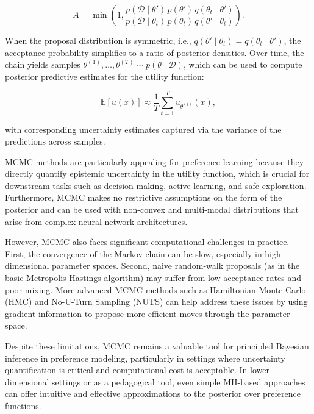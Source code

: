 \documentclass[
  letterpaper,
  numbers=noenddot,
  DIV=11]{scrreprt}
\theoremstyle{plain}
\theoremstyle{definition}
\theoremstyle{remark}
\begin{document}
\[
A = \min\left(1, \frac{p(\mathcal{D} \mid \theta') \, p(\theta') \, q(\theta_t \mid \theta')}{p(\mathcal{D} \mid \theta_t) \, p(\theta_t) \, q(\theta' \mid \theta_t)}\right).
\]

When the proposal distribution is symmetric, i.e.,
\(q(\theta' \mid \theta_t) = q(\theta_t \mid \theta')\), the acceptance
probability simplifies to a ratio of posterior densities. Over time, the
chain yields samples
\(\theta^{(1)}, \dots, \theta^{(T)} \sim p(\theta \mid \mathcal{D})\),
which can be used to compute posterior predictive estimates for the
utility function:

\[
\mathbb{E}[u(x)] \approx \frac{1}{T} \sum_{t=1}^T u_{\theta^{(t)}}(x),
\]

with corresponding uncertainty estimates captured via the variance of
the predictions across samples.

MCMC methods are particularly appealing for preference learning because
they directly quantify epistemic uncertainty in the utility function,
which is crucial for downstream tasks such as decision-making, active
learning, and safe exploration. Furthermore, MCMC makes no restrictive
assumptions on the form of the posterior and can be used with non-convex
and multi-modal distributions that arise from complex neural network
architectures.

However, MCMC also faces significant computational challenges in
practice. First, the convergence of the Markov chain can be slow,
especially in high-dimensional parameter spaces. Second, naive
random-walk proposals (as in the basic Metropolis-Hastings algorithm)
may suffer from low acceptance rates and poor mixing. More advanced MCMC
methods such as Hamiltonian Monte Carlo (HMC) and No-U-Turn Sampling
(NUTS) can help address these issues by using gradient information to
propose more efficient moves through the parameter space.

Despite these limitations, MCMC remains a valuable tool for principled
Bayesian inference in preference modeling, particularly in settings
where uncertainty quantification is critical and computational cost is
acceptable. In lower-dimensional settings or as a pedagogical tool, even
simple MH-based approaches can offer intuitive and effective
approximations to the posterior over preference functions.
\end{document}
